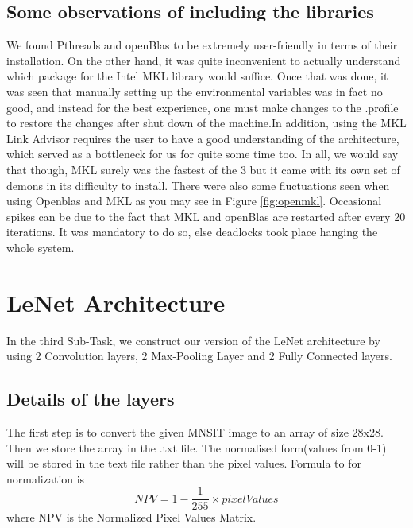 \documentclass[a4paper]{article}
\begin{document}
\subsection{Some observations of including the libraries}
We found Pthreads and openBlas to be extremely user-friendly in terms of their installation. On the other hand, it was quite inconvenient to actually understand which package for the Intel MKL library would suffice. Once that was done, it was seen that manually setting up the environmental variables was in fact no good, and instead for the best experience, one must make changes to the .profile to restore the changes after shut down of the machine.\newline In addition, using the MKL Link Advisor requires the user to have a good understanding of the architecture, which served as a bottleneck for us for quite some time too. In all, we would say that though, MKL surely was the fastest of the 3 but it came with its own set of demons in its difficulty to install.
There were also some fluctuations seen when using Openblas and MKL as you may see in Figure \ref{fig:openmkl}. Occasional spikes can be due to the fact that MKL and openBlas are restarted after every 20 iterations. It was mandatory to do so, else deadlocks took place hanging the whole system.

\section{LeNet Architecture}
In the third Sub-Task, we construct our version of the LeNet architecture by using 2 Convolution layers, 2 Max-Pooling Layer and 2 Fully Connected layers. 

\subsection{Details of the layers}
The first step is to convert the given MNSIT image to an array of size 28x28. Then we store the array in the .txt file. The normalised form(values from 0-1) will be stored in the text file rather than the pixel values. 
Formula to for normalization is 
\begin{equation}
NPV = 1 - \frac{1}{255} \times pixelValues
\end{equation}
where NPV is the Normalized Pixel Values Matrix.

\end{document}
